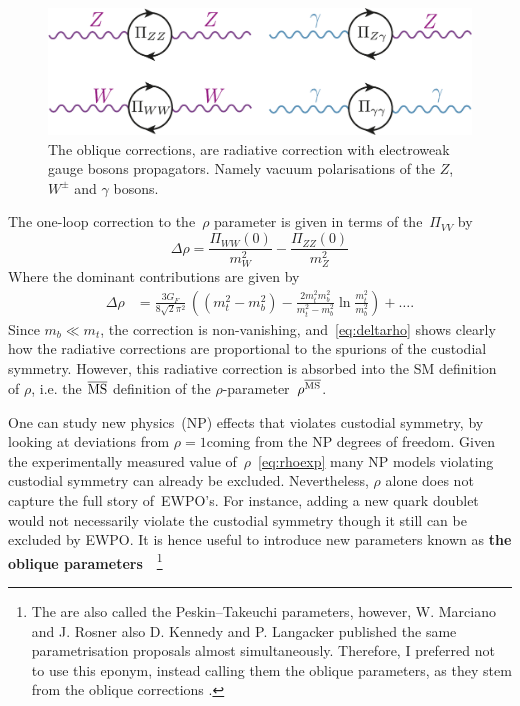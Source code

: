 \begin{figure}[htpb!]
	\centering
	\includegraphics[width=0.75\linewidth]{./figures/oblique_corrections}
	\caption{The oblique corrections, are radiative correction with electroweak gauge bosons propagators. Namely vacuum polarisations of the $Z$, $W^\pm$ and $\gamma$ bosons. }  \label{fig:oblique}
\end{figure}
The one-loop correction to the~$\rho$ parameter is given in terms of the~$\Pi_{VV}$  by
\begin{equation}
\Delta \rho = \frac{\Pi_{WW}(0)}{m_W^2}- \frac{\Pi_{ZZ}(0)}{m_Z^2}
\end{equation}
Where the dominant contributions are given by~\cite{EINHORN1981146}
\begin{align}
\Delta \rho & = \frac{3 G_F}{8\sqrt{2}\pi^2}\,\left((m_t^2-m_b^2)-\frac{2m_t^2m_b^2}{m_t^2-m_b^2}\ln \frac{m_t^2}{m_b^2} \right)+\dots.
\label{eq:deltarho}
\end{align}
Since $m_b\ll m_t$, the correction is non-vanishing, and~\eqref{eq:deltarho} shows clearly how the radiative corrections are proportional to the spurions of the custodial symmetry. However, this radiative correction is absorbed into the SM definition of $\rho$, i.e. the $\overline{\mathrm{MS}}$ definition of the $\rho$-parameter~$\rho^{\overline{\mathrm{MS}}}$.
\par One can study new physics~(NP) effects that violates custodial symmetry, by looking at deviations from $\rho=1$coming from the NP degrees of freedom. Given the experimentally measured value of~$\rho$~\eqref{eq:rhoexp} many NP models violating custodial symmetry can already be excluded. Nevertheless, $\rho$ alone does not capture the full story of~EWPO's. For instance, adding a new quark doublet would not necessarily violate the custodial symmetry though it still can be excluded by EWPO. It is hence useful to introduce new parameters known as \textbf{ the oblique parameters}~\cite{PhysRevLett.65.2963,PhysRevLett.65.964,PhysRevLett.66.395.2,Peskin91estimationof,peskin1995introduction}~\footnote{The are also called the Peskin–Takeuchi parameters, however, W. Marciano and J. Rosner also D. Kennedy and P. Langacker published the same parametrisation proposals almost simultaneously. Therefore, I preferred not to use this eponym, instead calling them the oblique parameters, as they stem from the oblique corrections .}
